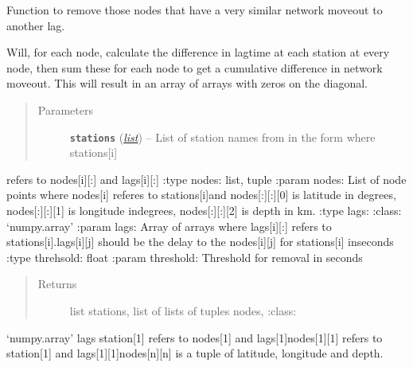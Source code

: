 \documentclass[a4paper,10pt,english]{sphinxmanual}
\begin{document}

\begin{fulllineitems}
\label{submodules/core.bright_lights:bright_lights._rm_similarlags}
Function to remove those nodes that have a very similar network moveout
to another lag.

Will, for each node, calculate the difference in lagtime at each station
at every node, then sum these for each node to get a cumulative difference
in network moveout.  This will result in an array of arrays with zeros on
the diagonal.
\begin{quote}\begin{description}
\item[{Parameters}] \leavevmode
\textbf{\texttt{stations}} (\href{https://docs.python.org/library/functions.html\#list}{\emph{list}}) -- List of station names from in the form where stations{[}i{]}

\end{description}\end{quote}

refers to nodes{[}i{]}{[}:{]} and lags{[}i{]}{[}:{]}
:type nodes: list, tuple
:param nodes: List of node points where nodes{[}i{]} referes to stations{[}i{]}and nodes{[}:{]}{[}:{]}{[}0{]} is latitude in degrees, nodes{[}:{]}{[}:{]}{[}1{]} is longitude indegrees, nodes{[}:{]}{[}:{]}{[}2{]} is depth in km.
:type lags: :class: `numpy.array'
:param lags: Array of arrays where lags{[}i{]}{[}:{]} refers to stations{[}i{]}.lags{[}i{]}{[}j{]} should be the delay to the nodes{[}i{]}{[}j{]} for stations{[}i{]} inseconds
:type threhsold: float
:param threshold: Threshold for removal in seconds
\begin{quote}\begin{description}
\item[{Returns}] \leavevmode
list stations, list of lists of tuples nodes, :class: 

\end{description}\end{quote}

`numpy.array' lags station{[}1{]} refers to nodes{[}1{]} and lags{[}1{]}nodes{[}1{]}{[}1{]} refers to station{[}1{]} and lags{[}1{]}{[}1{]}nodes{[}n{]}{[}n{]} is a tuple of latitude, longitude and depth.

\end{fulllineitems}
\end{document}
